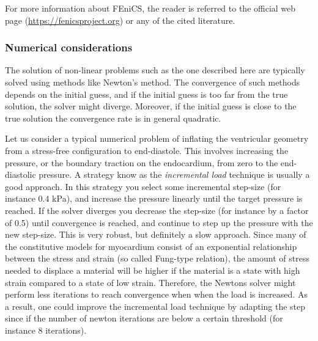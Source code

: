 For more information about FEniCS, the reader is referred to the
official web page (\url{https://fenicsproject.org}) or any of the
cited literature.

\subsubsection{Numerical considerations}
The solution of non-linear problems such as the one described here are
typically solved using methods like Newton's method. The convergence of
such methods depends on the initial guess, and if the
initial guess is too far from the true solution, the solver might diverge.
Moreover, if the initial guess is close to the true solution the
convergence rate is in general quadratic.

Let us consider a
typical numerical problem of inflating the ventricular geometry from a
stress-free configuration to end-diastole. This involves increasing
the pressure, or the boundary traction on the endocardium, from zero
to the end-diastolic pressure. A strategy know as the
\emph{incremental load} technique is usually a good approach. In this
strategy you select some incremental step-size (for instance $0.4$
kPa), and increase the pressure linearly until the target pressure is
reached. If the solver diverges you decrease the step-size (for
instance by a factor of 0.5) until convergence is reached, and
continue to step up the pressure with the new step-size. This is very
robust, but definitely a slow approach. Since many of the 
constitutive models for myocardium consist of an exponential
relationship between the stress and strain (so called Fung-type
relation), the amount of stress needed to displace a material will be
higher if the material is a state with high strain compared to a state
of low strain. Therefore, the Newtons solver might perform less
iterations to reach convergence when when the load is increased. As a
result, one could improve the incremental load technique by adapting
the step since if the number of newton iterations are below a certain
threshold (for instance $8$ iterations).

